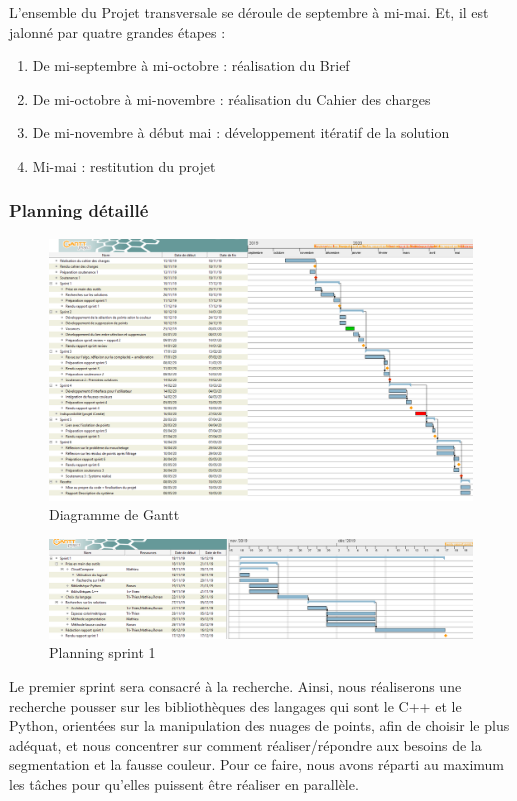 \documentclass[12pt,titlepage,french]{article}
\begin{document}
L'ensemble du Projet transversale se déroule de septembre à mi-mai. Et, il est jalonné par quatre grandes étapes :
\begin{enumerate}
\item De mi-septembre à mi-octobre : réalisation du Brief
\item De mi-octobre à mi-novembre : réalisation du Cahier des charges
\item De mi-novembre à début mai : développement itératif de la solution
\item Mi-mai : restitution du projet
\end{enumerate}
\break
\subsubsection*{Planning détaillé}

\begin{figure} [!hbtp]
 \centering
    \caption{Diagramme de Gantt}
    \label{Planning détaillé}
    \includegraphics[scale=0.5,angle=90,origin=c]{gantt.png}
\end{figure}
\break
\begin{figure} [!hbtp]
 \centering
    \caption{Planning sprint 1 }
    \label{Planning sprint 1}
    \includegraphics[width=\textwidth]{sprint_planning1.png}
\end{figure}
Le premier sprint sera consacré à la recherche. Ainsi, nous réaliserons une recherche pousser sur les bibliothèques des langages qui sont le C++ et le Python, orientées sur la manipulation des nuages de points, afin de choisir le plus adéquat, et nous concentrer sur comment réaliser/répondre aux besoins de la segmentation et la fausse couleur. Pour ce faire, nous avons réparti au maximum les tâches pour qu'elles puissent être réaliser en parallèle.
\end{document}

